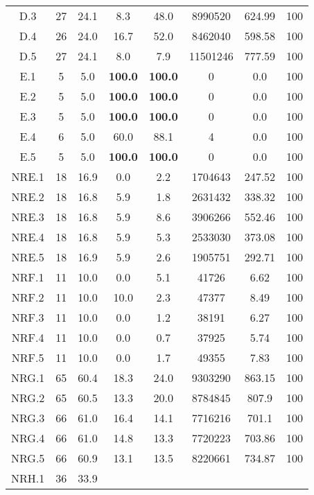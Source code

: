 \begin{longtable}{@{\extracolsep{5pt}}cccccccc}
	D.3 &
		27 & 24.1 &
			8.3
		&
			48.0
		& 8990520 & 624.99 & 100
	\\
	D.4 &
		26 & 24.0 &
			16.7
		&
			52.0
		& 8462040 & 598.58 & 100
	\\
	D.5 &
		27 & 24.1 &
			8.0
		&
			7.9
		& 11501246 & 777.59 & 100
	\\
	E.1 &
		5 & 5.0 &
			\textbf{100.0}
		&
			\textbf{100.0}
		& 0 & 0.0 & 100
	\\
	E.2 &
		5 & 5.0 &
			\textbf{100.0}
		&
			\textbf{100.0}
		& 0 & 0.0 & 100
	\\
	E.3 &
		5 & 5.0 &
			\textbf{100.0}
		&
			\textbf{100.0}
		& 0 & 0.0 & 100
	\\
	E.4 &
		6 & 5.0 &
			60.0
		&
			88.1
		& 4 & 0.0 & 100
	\\
	E.5 &
		5 & 5.0 &
			\textbf{100.0}
		&
			\textbf{100.0}
		& 0 & 0.0 & 100
	\\
	NRE.1 &
		18 & 16.9 &
			0.0
		&
			2.2
		& 1704643 & 247.52 & 100
	\\
	NRE.2 &
		18 & 16.8 &
			5.9
		&
			1.8
		& 2631432 & 338.32 & 100
	\\
	NRE.3 &
		18 & 16.8 &
			5.9
		&
			8.6
		& 3906266 & 552.46 & 100
	\\
	NRE.4 &
		18 & 16.8 &
			5.9
		&
			5.3
		& 2533030 & 373.08 & 100
	\\
	NRE.5 &
		18 & 16.9 &
			5.9
		&
			2.6
		& 1905751 & 292.71 & 100
	\\
	NRF.1 &
		11 & 10.0 &
			0.0
		&
			5.1
		& 41726 & 6.62 & 100
	\\
	NRF.2 &
		11 & 10.0 &
			10.0
		&
			2.3
		& 47377 & 8.49 & 100
	\\
	NRF.3 &
		11 & 10.0 &
			0.0
		&
			1.2
		& 38191 & 6.27 & 100
	\\
	NRF.4 &
		11 & 10.0 &
			0.0
		&
			0.7
		& 37925 & 5.74 & 100
	\\
	NRF.5 &
		11 & 10.0 &
			0.0
		&
			1.7
		& 49355 & 7.83 & 100
	\\
	NRG.1 &
		65 & 60.4 &
			18.3
		&
			24.0
		& 9303290 & 863.15 & 100
	\\
	NRG.2 &
		65 & 60.5 &
			13.3
		&
			20.0
		& 8784845 & 807.9 & 100
	\\
	NRG.3 &
		66 & 61.0 &
			16.4
		&
			14.1
		& 7716216 & 701.1 & 100
	\\
	NRG.4 &
		66 & 61.0 &
			14.8
		&
			13.3
		& 7720223 & 703.86 & 100
	\\
	NRG.5 &
		66 & 60.9 &
			13.1
		&
			13.5
		& 8220661 & 734.87 & 100
	\\
	NRH.1 &
		36 & 33.9 &

\end{longtable}
